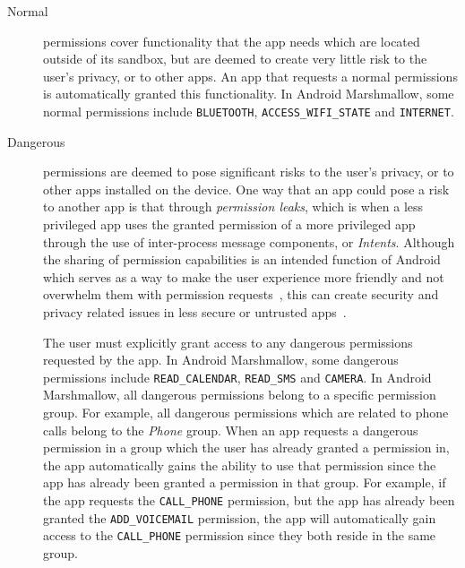 \documentclass{sig-alternate-05-2015}
\begin{document}
\begin{description}
  \item [Normal] permissions cover functionality that the app needs
    which are located outside of its sandbox, but are deemed to create
    very little risk to the user's privacy, or to other apps.  An app
    that requests a normal permissions is automatically granted this
    functionality. In Android Marshmallow, some normal permissions
    include \texttt{BLUETOOTH}, \texttt{ACCESS\_WIFI\_STATE} and
    \texttt{INTERNET}.

  \item [Dangerous] permissions are deemed to pose significant risks
    to the user's privacy, or to other apps installed on the device. One way that an app could pose a risk to another app is that through \emph{permission leaks}, which is when a less privileged app uses the granted permission of a more privileged app through the use of inter-process message components, or \emph{Intents}. Although the sharing of permission capabilities is an intended function of Android which serves as a way to make the user experience more friendly and not overwhelm them with permission requests~\cite{android_permissions_BestPractices_URL}, this can create security and privacy related issues in less secure or untrusted apps~\cite{FeltWMHC11}.

    The user must explicitly grant access to any dangerous permissions
    requested by the app.  In Android Marshmallow, some dangerous
    permissions include \texttt{READ\_CALENDAR}, \texttt{READ\_SMS}
    and \texttt{CAMERA}. In Android Marshmallow, all dangerous
    permissions belong to a specific permission group. For example,
    all dangerous permissions which are related to phone calls belong
    to the \emph{Phone} group. When an app requests a dangerous
    permission in a group which the user has already granted a
    permission in, the app automatically gains the ability to use that
    permission since the app has already been granted a permission in
    that group. For example, if the app requests the
    \texttt{CALL\_PHONE} permission, but the app has already been
    granted the \texttt{ADD\_VOICEMAIL} permission, the app will
    automatically gain access to the \texttt{CALL\_PHONE} permission
    since they both reside in the same group.
\end{description}
\end{document}
